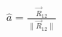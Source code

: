 \documentclass[preview]{standalone}
\begin{document}
\begin{align*}
\hat{a} = \frac{\vec{R}_{12}}{\|\vec{R}_{12}\|}
\end{align*}
\end{document}
